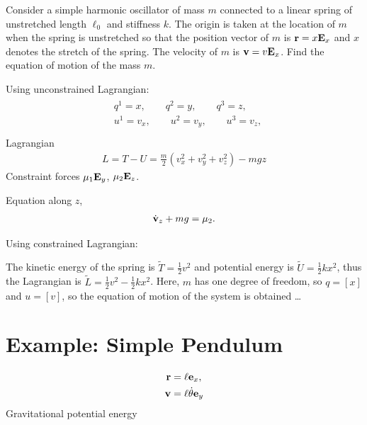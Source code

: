 \documentclass[
  letterpaper,
  DIV=11,
  numbers=noendperiod]{scrreprt}
\newcommand{\lp}{\left(}
\newcommand{\rp}{\right)}
\begin{document}
Consider a simple harmonic oscillator of mass \(m\) connected to a
linear spring of unstretched length \(\ell_0\) and stiffness \(k\). The
origin is taken at the location of \(m\) when the spring is unstretched
so that the position vector of \(m\) is \({\bf r} = x{\bf E}_x\) and
\(x\) denotes the stretch of the spring. The velocity of \(m\) is
\({\bf v} = v{\bf E}_x\). Find the equation of motion of the mass \(m\).

Using unconstrained Lagrangian: \begin{align}
    \begin{split}
        & q^1 = x,\qquad q^2 = y, \qquad q^3 = z,\\
        & u^1 = v_x,\qquad u^2 = v_y, \qquad u^3 = v_z,\\
    \end{split}
\end{align} Lagrangian \begin{align}
    L = T-U  = \frac{m}{2}\lp v_x^2+v_y^2+v_z^2\rp-mgz
\end{align} Constraint forces \(\mu_1{\bf E}_y\), \(\mu_2{\bf E}_z\).

Equation along \(z\), \begin{align}
    \begin{split}
        \dot{\bf v}_z+mg = \mu_2.
    \end{split}
\end{align}

Using constrained Lagrangian:

The kinetic energy of the spring is \(\tilde{T} = \frac{1}{2}v^2\) and
potential energy is \(\tilde{U} = \frac{1}{2}kx^2\), thus the Lagrangian
is \(\tilde{L} = \frac{1}{2}v^2-\frac{1}{2}kx^2\). Here, \(m\) has one
degree of freedom, so \(q = [x]\) and \(u = [v]\), so the equation of
motion of the system is obtained \ldots{}

\section{Example: Simple Pendulum}\label{example-simple-pendulum}

\begin{align}
    \begin{split}
        {\bf r} &= \ell{\bf e}_x,\\
        {\bf v} &= \ell\dot{\theta}{\bf e}_y
    \end{split}
\end{align} Gravitational potential energy
\end{document}
